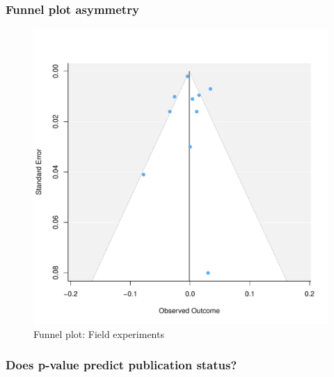 \documentclass[usenames,dvipsnames]{beamer}
\begin{document}
\begin{frame}[label=supplemental, noframenumbering]
\frametitle{Funnel plot asymmetry \hyperlink{pub_bias}{}}

\begin{figure}[!hb]
\vspace*{-3mm}
\includegraphics[scale = 0.45]{../figs/funnel_re_field.pdf}
\vspace{-0.2cm}
\caption{Funnel plot: Field experiments}
\small
\vspace{-0.5cm}
\label{fig: funnel_all}
\end{figure}
\end{frame}


\begin{frame}[label=p_ols_logit, noframenumbering]
\frametitle{Does p-value predict publication status? \hyperlink{pub_bias}{}}

\footnotesize


\end{frame}

\end{document}
